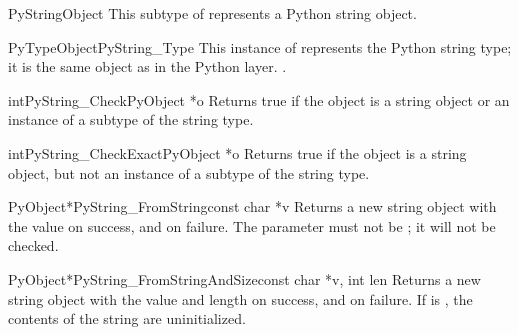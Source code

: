 \begin{ctypedesc}{PyStringObject}
  This subtype of  represents a Python string object.
\end{ctypedesc}

\begin{cvardesc}{PyTypeObject}{PyString_Type}
  This instance of  represents the Python string
  type; it is the same object as  in the Python
  layer.
  .
\end{cvardesc}

\begin{cfuncdesc}{int}{PyString_Check}{PyObject *o}
  Returns true if the object  is a string object or an instance
  of a subtype of the string type.
\end{cfuncdesc}

\begin{cfuncdesc}{int}{PyString_CheckExact}{PyObject *o}
  Returns true if the object  is a string object, but not an
  instance of a subtype of the string type.
\end{cfuncdesc}

\begin{cfuncdesc}{PyObject*}{PyString_FromString}{const char *v}
  Returns a new string object with the value  on success, and
  \NULL{} on failure.  The parameter  must not be \NULL{}; it
  will not be checked.
\end{cfuncdesc}

\begin{cfuncdesc}{PyObject*}{PyString_FromStringAndSize}{const char *v,
                                                         int len}
  Returns a new string object with the value  and length
   on success, and \NULL{} on failure.  If  is
  \NULL{}, the contents of the string are uninitialized.
\end{cfuncdesc}

